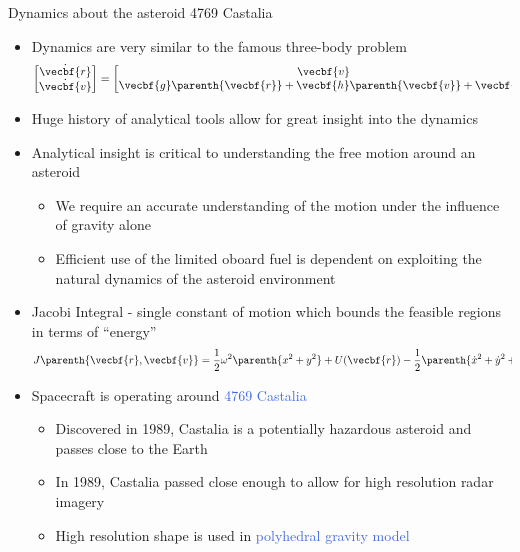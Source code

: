 \documentclass[final, usenames, dvipsnames]{beamer}
\newlength{\twocolwidth}
\def\Emph{\textcolor{RoyalBlue}}
\begin{document}
\begin{frame}[t]
\begin{columns}[T]
\begin{column}{\twocolwidth}
\begin{block}{Dynamics about the asteroid 4769 Castalia} %
	\begin{minipage}{0.5\columnwidth} %
	\begin{itemize}
		\item Dynamics are very similar to the famous three-body problem
			\[
			\begin{bmatrix} \dot{\vecbf{r}} \\ \dot{\vecbf{v}} \end{bmatrix} =
			\begin{bmatrix}\vecbf{v} \\ \vecbf{g} \parenth{\vecbf{r}} + \vecbf{h}\parenth{\vecbf{v}} + \vecbf{u} \end{bmatrix} 
			\]
		\item Huge history of analytical tools allow for great insight into the dynamics
		\item Analytical insight is critical to understanding the free motion around an asteroid
		\begin{itemize}
			\item We require an accurate understanding of the motion under the influence of gravity alone
			\item Efficient use of the limited oboard fuel is dependent on exploiting the natural dynamics of the asteroid environment
		\end{itemize}
		\item Jacobi Integral - single constant of motion which bounds the feasible regions in terms of ``energy''
			\[
			J \parenth{\vecbf{r}, \vecbf{v}} = \frac{1}{2} \omega^2 \parenth{x^2 + y^2} + U(\vecbf{r}) - \frac{1}{2} \parenth{\dot{x}^2 + \dot{y}^2 + \dot{z}^2} 
			\]
	\end{itemize}
	\end{minipage}%
	\begin{minipage}{0.5\columnwidth}%
        \begin{itemize}
            \item Spacecraft is operating around \Emph{4769 Castalia}
            \begin{itemize}
                \item Discovered in 1989, Castalia is a potentially hazardous asteroid and passes close to the Earth
                \item In 1989, Castalia passed close enough to allow for high resolution radar imagery
                \item High resolution shape is used in \Emph{polyhedral gravity model}

\end{itemize}
\end{itemize}
\end{minipage}
\end{block}
\end{column}
\end{columns}
\end{frame}
\end{document}
